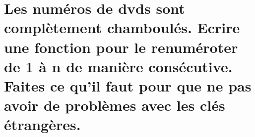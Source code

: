 \documentclass[11pt]{article}
\begin{document}
    
    \hypertarget{les-numuxe9ros-de-dvds-sont-compluxe8tement-chambouluxe9s.-ecrire-une-fonction-pour-le-renumuxe9roter-de-1-uxe0-n-de-maniuxe8re-consuxe9cutive.-faites-ce-quil-faut-pour-que-ne-pas-avoir-de-probluxe8mes-avec-les-cluxe9s-uxe9tranguxe8res.}{%
\section{Les numéros de dvds sont complètement chamboulés. Ecrire une
fonction pour le renuméroter de 1 à n de manière consécutive. Faites ce
qu'il faut pour que ne pas avoir de problèmes avec les clés
étrangères.}\label{les-numuxe9ros-de-dvds-sont-compluxe8tement-chambouluxe9s.-ecrire-une-fonction-pour-le-renumuxe9roter-de-1-uxe0-n-de-maniuxe8re-consuxe9cutive.-faites-ce-quil-faut-pour-que-ne-pas-avoir-de-probluxe8mes-avec-les-cluxe9s-uxe9tranguxe8res.}}
\end{document}
